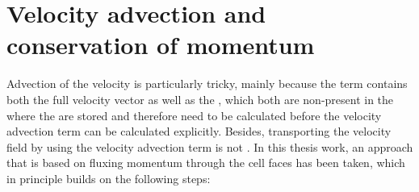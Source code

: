 \section{Velocity advection and conservation of momentum}

Advection of the velocity is particularly tricky, mainly because the  term contains both the full velocity vector as well as the , which both are non-present in the  where the  are stored and therefore need to be calculated before the velocity advection term can be calculated explicitly. Besides, transporting the velocity field by using the velocity advection term is not . In this thesis work, an approach that is based on fluxing momentum through the cell faces has been taken, which in principle builds on the following steps:

